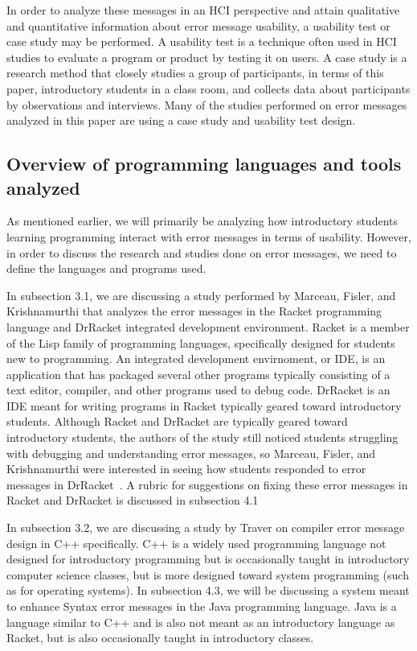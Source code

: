 \documentclass{sig-alternate}
\begin{document}
In order to analyze these messages in an HCI perspective and attain qualitative and quantitative information about error message usability, a usability test or case study may be performed. A usability test is a technique often used in HCI studies to evaluate a program or product by testing it on users. A case study is a research method that closely studies a group of participants, in terms of this paper, introductory students in a class room, and collects data about participants by observations and interviews. Many of the studies performed on error messages analyzed in this paper are using a case study and usability test design. 



\subsection{Overview of programming languages and tools analyzed}

As mentioned earlier, we will primarily be analyzing how introductory students learning programming interact with error messages in terms of usability. However, in order to discuss the research and studies done on error messages, we need to define the languages and programs used.  

In subsection 3.1, we are discussing a study performed by Marceau, Fisler, and Krishnamurthi that analyzes the error messages in the Racket programming language and DrRacket integrated development environment. Racket is a member of the Lisp family of programming languages, specifically designed for students new to programming. An integrated development envirnoment, or IDE, is an application that has packaged several other programs typically consisting of a text editor, compiler, and other programs used to debug code. DrRacket is an IDE meant for writing programs in Racket typically geared toward introductory students. Although Racket and DrRacket are typically geared toward introductory students, the authors of the study still noticed students struggling with debugging and understanding error messages, so Marceau, Fisler, and Krishnamurthi were interested in seeing how students responded to error messages in DrRacket~\cite{Marceau:2011:MYL:2048237.2048241}. A rubric for suggestions on fixing these error messages in Racket and DrRacket is discussed in subsection 4.1 

In subsection 3.2, we are discussing a study by Traver on compiler error message design in C++ specifically. C++ is a widely used programming language not designed for introductory programming but is occasionally taught in introductory computer science classes, but is more designed toward system programming (such as for operating systems). In subsection 4.3, we will be discussing a system meant to enhance Syntax error messages in the Java programming language. Java is a language similar to C++ and is also not meant as an introductory language as Racket, but is also occasionally taught in introductory classes. 
\end{document}
